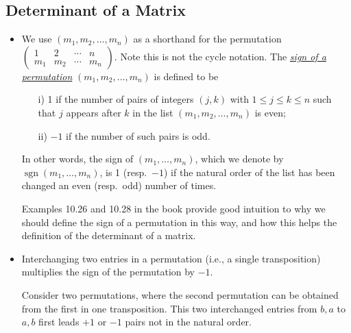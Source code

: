 \documentclass[11pt]{article}
\newcommand{\df}[1]{\ul{\textit{\textsf{#1}}}}
\newcommand{\sgn}{\operatorname{sgn}}
\begin{document}
\subsection{Determinant of a Matrix}
\begin{itemize}
    \item We use $(m_1,m_2,\dots,m_n)$ as a shorthand for the permutation $\begin{pmatrix} 1 & 2 & \cdots & n \\ m_1 & m_2 & \cdots & m_n \end{pmatrix}$. Note this is not the cycle notation. The \df{sign of a permutation} $(m_1,m_2,\dots,m_n)$ is defined to be
    \begin{enumerate}
        \item [i)] 1 if the number of pairs of integers $(j,k)$ with $1 \leq j \leq k \leq n$ such that $j$ appears after $k$ in the list $(m_1,m_2,\dots,m_n)$ is even;
        \item [ii)] $-1$ if the number of such pairs is odd.
    \end{enumerate}
    In other words, the sign of $(m_1,\dots,m_n)$, which we denote by $\sgn(m_1,\dots,m_n)$, is 1 (resp.\ $-1$) if the natural order of the list has been changed an even (resp.\ odd) number of times.
    
    Examples 10.26 and 10.28 in the book provide good intuition to why we should define the sign of a permutation in this way, and how this helps the definition of the determinant of a matrix.
    
    \item Interchanging two entries in a permutation (i.e., a single transposition) multiplies the sign of the permutation by $-1$.
    
    Consider two permutations, where the second permutation can be obtained from the first in one transposition. This two interchanged entries from $b,a$ to $a,b$ first leads $+1$ or $-1$ pairs not in the natural order.


\end{itemize}
\end{document}
